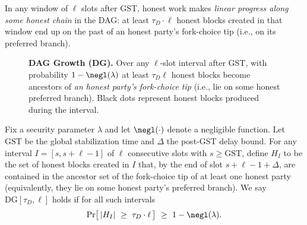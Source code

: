 In any window of $\ell$ slots after GST, honest work makes \emph{linear progress along some honest chain} in the DAG: at least $\tau_D\cdot \ell$ honest blocks created in that window end up on the past of an honest party’s fork-choice tip (i.e., on its preferred branch).

\begin{figure}[htp!]
\centering
{}
\caption{\textbf{DAG Growth (DG).}
\small
Over any $\ell$-slot interval after GST, with probability $1-\negl(\lambda)$ at least $\tau_D\ell$ honest blocks become ancestors of \emph{an honest party’s fork-choice tip} (i.e., lie on some honest preferred branch). 
Black dots represent honest blocks produced during the interval.}

\label{fig:dg}
\end{figure}

\begin{definition}\label{def:DG}
Fix a security parameter $\lambda$ and let $\negl(\cdot)$ denote a negligible function.
Let $\mathrm{GST}$ be the global stabilization time and $\Delta$ the post-GST delay bound.
For any interval $I=[s,s+\ell-1]$ of $\ell$ consecutive slots with $s\ge \mathrm{GST}$, define $H_I$ to be the set of honest blocks created in $I$ that, by the end of slot $s+\ell-1+\Delta$, are contained in the ancestor set of the fork-choice tip of at least one honest party (equivalently, they lie on some honest party’s preferred branch).
We say $\mathrm{DG}[\tau_D,\ell]$ holds if for all such intervals
\[
\Pr\!\big[\,|H_I|\ \ge\ \tau_D\cdot \ell\,\big]\ \ge\ 1-\negl(\lambda).
\]
\end{definition}

